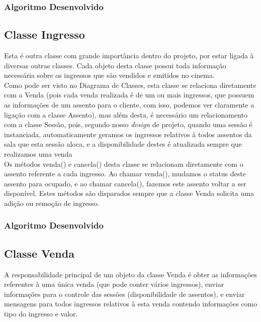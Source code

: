 \documentclass[a4paper]{article}
\begin{document}
\subsubsection{Algoritmo Desenvolvido}


\pagebreak

\subsection{Classe Ingresso}
\hspace{5 mm}Esta é outra classe com grande importância dentro do projeto, por estar ligada à diversas outras classes. Cada objeto desta classe possui toda informação necessária sobre os ingressos que são vendidos e emitidos no cinema.\\
\quad{\null}\hspace{5 mm}Como pode ser visto no Diagrama de Classes, esta classe se relaciona diretamente com a Venda (pois cada venda realizada é de um ou mais ingressos, que possuem as informações de um assento para o cliente, com isso, podemos ver claramente a ligação com a classe Assento), mas além desta, é necessário um relacionamento com a classe Sessão, pois, segundo nosso \textit{design} de projeto, quando uma sessão é instanciada, automaticamente geramos os ingressos relativos à todos assentos da sala que esta sessão aloca, e a disponibilidade destes é atualizada sempre que realizamos uma venda\\
\quad{\null}\hspace{5 mm}Os métodos venda() e cancela() desta classe se relacionam diretamente com o assento referente a cada ingresso. Ao chamar venda(), mudamos o status deste assento para ocupado, e ao chamar cancela(), fazemos este assento voltar a ser disponível. Estes métodos são disparados sempre que a classe Venda solicita uma adição ou remoção de ingresso.

\subsubsection{Algoritmo Desenvolvido}


\pagebreak

\subsection{Classe Venda}
\hspace{5 mm}A responsabilidade principal de um objeto da classe Venda é obter as informações referentes à uma única venda (que pode conter vários ingressos), enviar informações para o controle das sessões (disponibilidade de assentos), e enviar mensagens para todos ingressos relativos à esta venda contendo informações como tipo do ingresso e valor.
\quad{\null}\hspace{5 mm}
\end{document}
